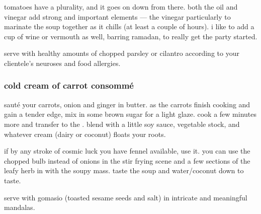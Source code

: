 tomatoes have a plurality, and it goes on down from there. both the
oil and vinegar add strong and important elements --- the vinegar
particularly to marinate the soup together as it chills (at least a
couple of hours). i like to add a cup of wine or vermouth as well,
barring ramadan, to really get the party started.
		
serve with healthy amounts of chopped parsley or cilantro according to
your clientele's neuroses and food allergies.

\subsubsection{cold cream of carrot consomm\'{e}}

saut\'{e} your carrots, onion and ginger in butter. as the carrots
finish cooking and gain a tender edge, mix in some brown sugar for a
light glaze. cook a few minutes more and transfer to the . blend
with a little soy sauce, vegetable stock, and whatever cream (dairy or
coconut) floats your roots.

if by any stroke of cosmic luck you have fennel available, use it. you
can use the chopped bulb instead of onions in the stir frying scene
and a few sections of the leafy herb in with the soupy mass. taste the
soup and water/coconut down to taste.

serve with gomasio (toasted sesame seeds and salt) in intricate and
meaningful mandalas.
